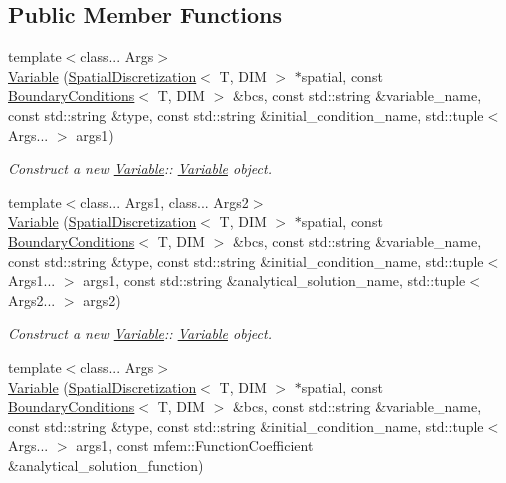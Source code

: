 \subsection*{Public Member Functions}
\begin{DoxyCompactItemize}
\item 
{\footnotesize template$<$class... Args$>$ }\\\hyperlink{classVariable_a1d561592ee426bc46146b6101275955b}{Variable} (\hyperlink{classSpatialDiscretization}{Spatial\+Discretization}$<$ T, D\+IM $>$ $\ast$spatial, const \hyperlink{classBoundaryConditions}{Boundary\+Conditions}$<$ T, D\+IM $>$ \&bcs, const std\+::string \&variable\+\_\+name, const std\+::string \&type, const std\+::string \&initial\+\_\+condition\+\_\+name, std\+::tuple$<$ Args... $>$ args1)
\begin{DoxyCompactList}\small\item\em Construct a new \hyperlink{classVariable}{Variable}\+:\+: \hyperlink{classVariable}{Variable} object. \end{DoxyCompactList}\item 
{\footnotesize template$<$class... Args1, class... Args2$>$ }\\\hyperlink{classVariable_a50b964af525aa643090fd485d7d8637b}{Variable} (\hyperlink{classSpatialDiscretization}{Spatial\+Discretization}$<$ T, D\+IM $>$ $\ast$spatial, const \hyperlink{classBoundaryConditions}{Boundary\+Conditions}$<$ T, D\+IM $>$ \&bcs, const std\+::string \&variable\+\_\+name, const std\+::string \&type, const std\+::string \&initial\+\_\+condition\+\_\+name, std\+::tuple$<$ Args1... $>$ args1, const std\+::string \&analytical\+\_\+solution\+\_\+name, std\+::tuple$<$ Args2... $>$ args2)
\begin{DoxyCompactList}\small\item\em Construct a new \hyperlink{classVariable}{Variable}\+:\+: \hyperlink{classVariable}{Variable} object. \end{DoxyCompactList}\item 
{\footnotesize template$<$class... Args$>$ }\\\hyperlink{classVariable_a711ed81807391502c93317c83e18b112}{Variable} (\hyperlink{classSpatialDiscretization}{Spatial\+Discretization}$<$ T, D\+IM $>$ $\ast$spatial, const \hyperlink{classBoundaryConditions}{Boundary\+Conditions}$<$ T, D\+IM $>$ \&bcs, const std\+::string \&variable\+\_\+name, const std\+::string \&type, const std\+::string \&initial\+\_\+condition\+\_\+name, std\+::tuple$<$ Args... $>$ args1, const mfem\+::\+Function\+Coefficient \&analytical\+\_\+solution\+\_\+function)

\end{DoxyCompactItemize}
